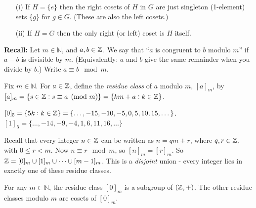 \documentclass[10pt]{scrartcl}
\begin{document}
\begin{remarks}\begin{enumerate}
\item[(i)] If $H = \{e\}$ then the right cosets of $H$ in $G$ are just singleton (1-element)	 sets $\{g\}$ for $g \in G$. (These are also the left cosets.) 
\item[(ii)] If $H = G$ then the only right (or left) coset is $H$ itself.
\end{enumerate}
\end{remarks}\vspace*{5pt}




\textbf{Recall:}   
Let $m \in \mathbb{N}$, and $a,b \in \mathbb{Z}$. We say that ``$a$ is congruent to $b$ modulo $m$'' if $a-b$ is divisible by $m$. (Equivalently: $a$ and $b$ give the same remainder when you divide by $b$.) Write $a \equiv b \mod m$.\\

\begin{definition} Fix $m \in \mathbb{N}$. For $a \in \mathbb{Z}$, define the \emph{residue class} of $a$ modulo $m$, $[a]_m$, by $[a]_m = \{s \in \mathbb{Z} : s \equiv a \pmod{m}\} = \{km + a : k \in \mathbb{Z}\}$.	
\end{definition}\vspace*{5pt}



\begin{examples} $[0]_5 = \{5k : k \in \mathbb{Z}\} = \{\dots, -15,-10,-5,0,5,10,15,\dots\}$.\\
$[1]_5 = \{\dots,-14,-9,-4,1,6,11,16,\dots\}$
\end{examples}

Recall that every integer $n \in \mathbb{Z}$ can be written as $n = qm + r$, where $q,r \in \mathbb{Z}$, with $0 \leq r < m$. Now $n \equiv r \mod m$, so $[n]_m = [r]_m$. So $\mathbb{Z} = [0]_m \cup [1]_m \cup \dots \cup [m-1]_m$. This is a \emph{disjoint} union - every integer lies in exactly one of these residue classes.\\

\begin{proposition} For any $m \in \mathbb{N}$, the residue class $[0]_m$ is a subgroup of $(\mathbb{Z},+)$. The other residue classes modulo $m$ are cosets of $[0]_m$. 	
\end{proposition}
\end{document}
